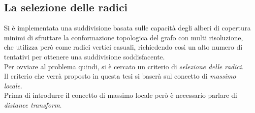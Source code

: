 {\subsection{La selezione delle radici}
Si è implementata una suddivisione basata sulle capacità degli alberi di copertura minimi di sfruttare la conformazione topologica del grafo con multi risoluzione, che utilizza però come radici vertici casuali, richiedendo così un alto numero di tentativi per ottenere una suddivisione soddisfacente.\\
Per ovviare al problema quindi, si è cercato un criterio di \emph{selezione delle radici}.\\
Il criterio che verrà proposto in questa tesi si baserà sul concetto di \emph{massimo locale}.\\
Prima di introdurre il concetto di massimo locale però è necessario parlare di \emph{distance transform}.

}
